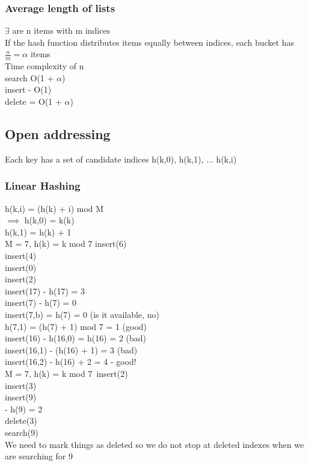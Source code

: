 \documentclass[12pt]{article}
\begin{document}
	\subsubsection*{Average length of lists}
	$\exists$ are n items with m indices\\
	If the hash function distributes items equally between indices, each bucket has $\frac{n}{m} = \alpha$ items\\
	
	Time  complexity of n\\
	search O(1 + $\alpha$)\\
	insert - O(1)\\
	delete = O(1 + $\alpha$)\\
	
	
	\subsection*{Open addressing}
	Each key has a set of candidate indices h(k,0), h(k,1), ... h(k,i)\\
	
	\subsubsection*{Linear Hashing}
	h(k,i) = (h(k) + i) mod M\\
	$\implies$ h(k,0) = k(k)\\
	h(k,1) = h(k) + 1\\
	
	M = 7, h(k) = k mod 7
	insert(6)\\
	insert(4)\\
	insert(0)\\
	insert(2)\\
	insert(17) - h(17) = 3\\
	insert(7) - h(7) = 0\\
	insert(7,b) = h(7) = 0 (is it available, no)\\
	h(7,1) = (h(7) + 1) mod 7 = 1 (good)\\
	insert(16) - h(16,0) = h(16) = 2 (bad)\\
	insert(16,1) - (h(16) + 1) = 3 (bad)\\
	insert(16,2) - h(16) + 2 = 4 - good!\\
	
	M = 7, h(k) = k mod 7\
	insert(2)\\
	insert(3)\\
	insert(9)\\ - h(9) = 2\\
	delete(3)\\
	search(9)\\
	
	We need to mark things as deleted so we do not stop at deleted indexes when we are searching for 9\\
	
\end{document}
